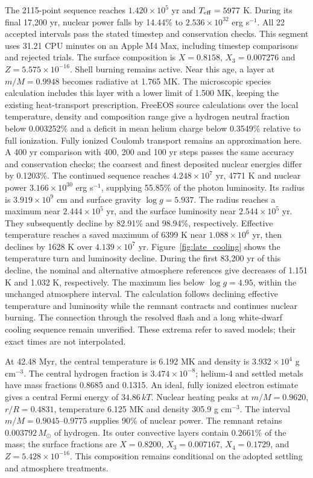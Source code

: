 \documentclass[11pt,letterpaper]{article}
\begin{document}
The 2115-point sequence reaches $1.420\times10^5$ yr and
$T_{\rm eff}=5977$ K. During its final 17,200 yr, nuclear power falls by
14.44\% to $2.536\times10^{32}$ erg s$^{-1}$. All 22 accepted intervals
pass the stated timestep and conservation checks. This segment uses
31.21 CPU minutes on an Apple M4 Max, including timestep comparisons
and rejected trials. The surface composition is $X=0.8158$,
$X_3=0.007276$ and $Z=5.575\times10^{-16}$. Shell burning remains active.
Near this age, a layer at $m/M=0.9948$ becomes radiative at 1.765 MK.
The microscopic species calculation includes this layer with a lower limit
of 1.500 MK, keeping the existing heat-transport prescription.
FreeEOS source calculations over the local temperature, density and composition
range give a hydrogen neutral fraction below 0.003252\% and a deficit in
mean helium charge below 0.3549\% relative to full ionization. Fully ionized
Coulomb transport remains an approximation here. A 400 yr comparison with
400, 200 and 100 yr steps passes the same accuracy and conservation checks;
the coarsest and finest deposited nuclear energies differ by 0.1203\%.
The continued sequence reaches $4.248\times10^7$ yr, 4771 K and nuclear
power $3.166\times10^{30}$ erg s$^{-1}$, supplying 55.85\% of the photon
luminosity. Its radius is $3.919\times10^9$ cm and surface gravity
$\log g=5.937$. The radius reaches a maximum near $2.444\times10^5$ yr,
and the surface luminosity near $2.544\times10^5$ yr. They subsequently decline
by 82.91\% and 98.94\%, respectively. Effective temperature reaches a saved maximum of
6399 K near $1.088\times10^6$ yr, then declines by 1628 K over $4.139\times10^7$ yr.
Figure~\ref{fig:late_cooling} shows the temperature turn and luminosity decline.
During the first 83,200 yr of this decline, the nominal and alternative
atmosphere references give decreases of 1.151 K and 1.032 K, respectively.
The maximum lies below $\log g=4.95$, within the unchanged atmosphere interval.
The calculation follows declining effective temperature and luminosity while
the remnant contracts and continues nuclear burning. The connection through
the resolved flash and a long white-dwarf cooling sequence remain unverified.
These extrema refer to saved models; their exact times are not interpolated.

At 42.48 Myr, the central temperature is 6.192 MK and density is
$3.932\times10^4$ g cm$^{-3}$. The central hydrogen fraction is
$3.474\times10^{-8}$; helium-4 and settled metals have mass fractions
0.8685 and 0.1315. An ideal, fully ionized electron estimate gives a central
Fermi energy of $34.86\,kT$. Nuclear heating peaks at $m/M=0.9620$,
$r/R=0.4831$, temperature 6.125 MK and density 305.9 g cm$^{-3}$.
The interval $m/M=0.9045$--0.9775 supplies 90\% of nuclear power.
The remnant retains $0.003792\,M_\odot$ of hydrogen. Its outer convective
layers contain $0.2661\%$ of the mass; the surface fractions are
$X=0.8200$, $X_3=0.007167$, $X_4=0.1729$, and
$Z=5.428\times10^{-16}$. This composition remains conditional on the
adopted settling and atmosphere treatments.
\end{document}
